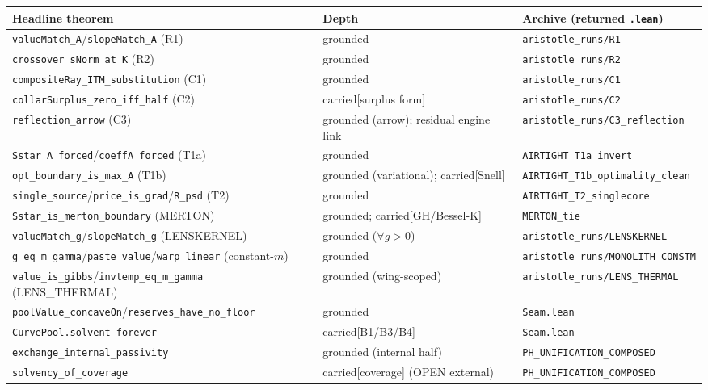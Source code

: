 \documentclass[11pt]{article}
\begin{document}
\begin{center}
\begin{tabularx}{\textwidth}{@{}l l X@{}}
\toprule
Headline theorem & Depth & Archive (returned \texttt{.lean}) \\
\midrule
\texttt{valueMatch\_A}/\texttt{slopeMatch\_A} (R1) & grounded & \texttt{aristotle\_runs/R1} \\
\texttt{crossover\_sNorm\_at\_K} (R2) & grounded & \texttt{aristotle\_runs/R2} \\
\texttt{compositeRay\_ITM\_substitution} (C1) & grounded & \texttt{aristotle\_runs/C1} \\
\texttt{collarSurplus\_zero\_iff\_half} (C2) & carried[surplus form] & \texttt{aristotle\_runs/C2} \\
\texttt{reflection\_arrow} (C3) & grounded (arrow); residual engine link & \texttt{aristotle\_runs/C3\_reflection} \\
\texttt{Sstar\_A\_forced}/\texttt{coeffA\_forced} (T1a) & grounded & \texttt{AIRTIGHT\_T1a\_invert} \\
\texttt{opt\_boundary\_is\_max\_A} (T1b) & grounded (variational); carried[Snell] & \texttt{AIRTIGHT\_T1b\_optimality\_clean} \\
\texttt{single\_source}/\texttt{price\_is\_grad}/\texttt{R\_psd} (T2) & grounded & \texttt{AIRTIGHT\_T2\_singlecore} \\
\texttt{Sstar\_is\_merton\_boundary} (MERTON) & grounded; carried[GH/Bessel-K] & \texttt{MERTON\_tie} \\
\texttt{valueMatch\_g}/\texttt{slopeMatch\_g} (LENSKERNEL) & grounded ($\forall g>0$) & \texttt{aristotle\_runs/LENSKERNEL} \\
\texttt{g\_eq\_m\_gamma}/\texttt{paste\_value}/\texttt{warp\_linear} (constant-$m$) & grounded & \texttt{aristotle\_runs/MONOLITH\_CONSTM} \\
\texttt{value\_is\_gibbs}/\texttt{invtemp\_eq\_m\_gamma} (LENS\_THERMAL) & grounded (wing-scoped) & \texttt{aristotle\_runs/LENS\_THERMAL} \\
\texttt{poolValue\_concaveOn}/\texttt{reserves\_have\_no\_floor} & grounded & \texttt{Seam.lean} \\
\texttt{CurvePool.solvent\_forever} & carried[B1/B3/B4] & \texttt{Seam.lean} \\
\texttt{exchange\_internal\_passivity} & grounded (internal half) & \texttt{PH\_UNIFICATION\_COMPOSED} \\
\texttt{solvency\_of\_coverage} & carried[coverage] (OPEN external) & \texttt{PH\_UNIFICATION\_COMPOSED} \\
\bottomrule
\end{tabularx}
\end{center}
\end{document}
